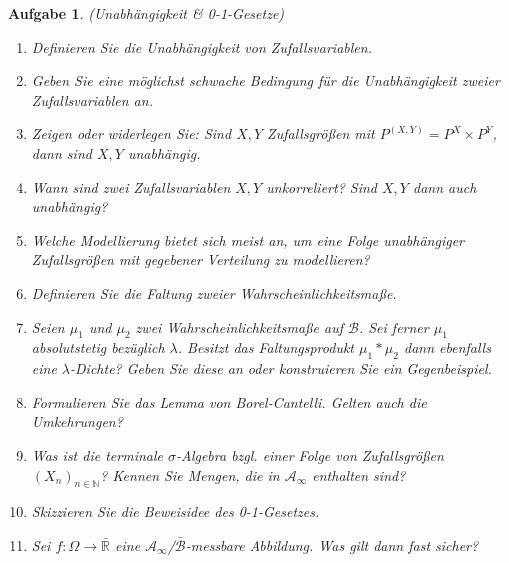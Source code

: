 \documentclass[11pt, a4paper, ngerman]{article}
\newcommand{\N}{\mathbb{N}}
\newcommand{\R}{\mathbb{R}}
\newtheorem{aufgabe}{Aufgabe}
\begin{document}
\begin{aufgabe} (Unabhängigkeit \& 0-1-Gesetze)
   \begin{enumerate}
        \item 
        Definieren Sie die Unabhängigkeit von Zufallsvariablen.
        \item 
        Geben Sie eine möglichst schwache Bedingung für die Unabhängigkeit zweier Zufallsvariablen an. 
        \item 
        Zeigen oder widerlegen Sie: Sind $X,Y$ Zufallsgrößen mit  $P^{(X,Y)} = P^X \times P^Y$, dann sind $X,Y$ unabhängig. 
        \item 
        Wann sind zwei Zufallsvariablen $X,Y$ unkorreliert? Sind $X,Y$ dann auch unabhängig? 
        \item 
        Welche Modellierung bietet sich meist an, um eine Folge unabhängiger Zufallsgrößen mit gegebener Verteilung zu modellieren? 
        \item 
        Definieren Sie die Faltung zweier Wahrscheinlichkeitsmaße. 
        \item 
        Seien $\mu_1$ und $\mu_2$ zwei Wahrscheinlichkeitsmaße auf $\mathcal{B}$. Sei ferner $\mu_1$ absolutstetig bezüglich $\lambda$. Besitzt das Faltungsprodukt $\mu_1 * \mu_2$ dann ebenfalls eine $\lambda$-Dichte? Geben Sie diese an oder konstruieren Sie ein Gegenbeispiel. 
        \item   
        Formulieren Sie das Lemma von Borel-Cantelli. Gelten auch die Umkehrungen? 
        \item
        Was ist die terminale $\sigma$-Algebra bzgl. einer Folge von Zufallsgrößen $(X_n)_{n \in \N}$? Kennen Sie Mengen, die in $\mathcal{A}_{\infty}$ enthalten sind? 
        \item 
        Skizzieren Sie die Beweisidee des 0-1-Gesetzes. 
        \item 
        Sei $f: \Omega \to \bar{\R}$ eine $\mathcal{A}_{\infty}$/$\bar{\mathcal{B}}$-messbare Abbildung. Was gilt dann fast sicher? 
    \end{enumerate}
    
\end{aufgabe}
\end{document}
